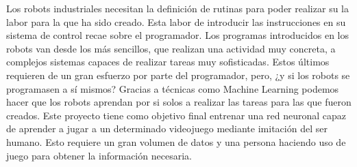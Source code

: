 
Los robots industriales necesitan la definición de rutinas para poder realizar su la labor para la que ha sido creado. Esta labor de introducir las instrucciones en su sistema de control recae sobre el programador. Los programas introducidos en los robots van desde los más sencillos, que realizan una actividad muy concreta, a complejos sistemas capaces de realizar tareas muy sofisticadas. Estos últimos requieren de un gran esfuerzo por parte del programador, pero, ¿y si los robots se programasen a sí mismos? Gracias a técnicas como Machine Learning podemos hacer que los robots aprendan por si solos a realizar las tareas para las que fueron creados.
Este proyecto tiene como objetivo final entrenar una red neuronal capaz de aprender a jugar a un determinado videojuego mediante imitación del ser humano. Esto requiere un gran volumen de datos y una persona haciendo uso de juego para obtener la información necesaria.
